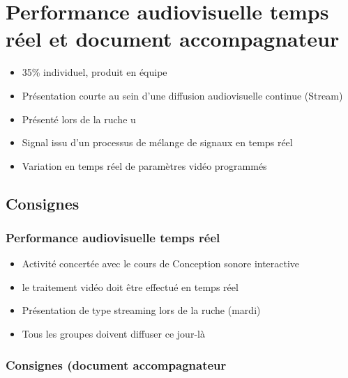 \documentclass[
  french,
]{book}
\providecommand{\tightlist}{%
  \setlength{\itemsep}{0pt}\setlength{\parskip}{0pt}}
\begin{document}
\hypertarget{sommatif_5}{%
\section{Performance audiovisuelle temps réel et document accompagnateur}\label{sommatif_5}}

\begin{itemize}
\tightlist
\item
  35\% individuel, produit en équipe
\item
  Présentation courte au sein d'une diffusion audiovisuelle continue (Stream)
\item
  Présenté lors de la ruche u
\item
  Signal issu d'un processus de mélange de signaux en temps réel
\item
  Variation en temps réel de paramètres vidéo programmés
\end{itemize}

\hypertarget{consignes-4}{%
\subsection{Consignes}\label{consignes-4}}

\hypertarget{performance-audiovisuelle-temps-ruxe9el}{%
\subsubsection{Performance audiovisuelle temps réel}\label{performance-audiovisuelle-temps-ruxe9el}}

\begin{itemize}
\tightlist
\item
  Activité concertée avec le cours de Conception sonore interactive
\item
  le traitement vidéo doit être effectué en temps réel
\item
  Présentation de type streaming lors de la ruche (mardi)
\item
  Tous les groupes doivent diffuser ce jour-là
\end{itemize}

\hypertarget{consignes-document-accompagnateur}{%
\subsubsection{Consignes (document accompagnateur}\label{consignes-document-accompagnateur}}
\end{document}
